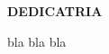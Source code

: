 
\label{tcc:dedicatoria}

\begin{center}
\textbf{DEDICAT\OH RIA}
\end{center}

\noindent bla bla bla
